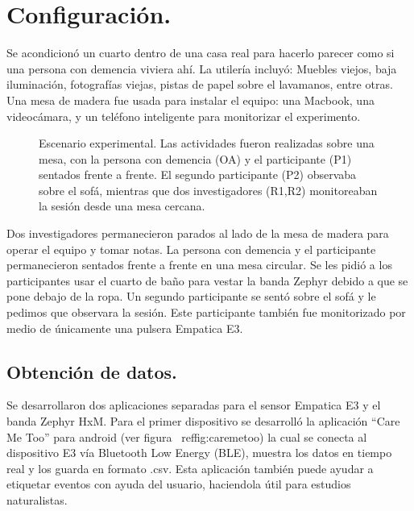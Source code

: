 \section{Configuraci\'on.}\label{secc:setup}
Se acondicion\'o un cuarto dentro de una casa real para hacerlo parecer como si una persona con demencia viviera ah\'i. La utiler\'ia incluy\'o: Muebles viejos, baja iluminaci\'on, fotograf\'ias viejas, pistas de papel sobre el lavamanos, entre otras. Una mesa de madera fue usada para instalar el equipo: una Macbook, una videoc\'amara, y un tel\'efono inteligente para monitorizar el experimento.
\begin{figure}[h]
        \centering
        \caption{Escenario experimental. Las actividades fueron realizadas sobre una mesa, con la persona con demencia (OA) y el participante (P1) sentados frente a frente. El segundo participante (P2) observaba sobre el sof\'a, mientras que dos investigadores (R1,R2) monitoreaban la sesi\'on desde una mesa cercana.} \label{fig:img_exp_setup}
\end{figure}

Dos investigadores permanecieron parados al lado de la mesa de madera para operar el equipo y tomar notas. La persona con demencia y el participante permanecieron sentados frente a frente en una mesa circular. Se les pidi\'o a los participantes usar el cuarto de ba\~no para vestar la banda Zephyr debido a que se pone debajo de la ropa. Un segundo participante se sent\'o sobre el sof\'a y le pedimos que observara la sesi\'on. Este participante tambi\'en fue monitorizado por medio de \'unicamente una pulsera Empatica E3.


\subsection{Obtenci\'on de datos.}\label{secc:datagathering}
Se desarrollaron dos aplicaciones separadas para el sensor Empatica E3 y el banda Zephyr HxM. Para el primer dispositivo se desarroll\'o la aplicaci\'on ``Care Me Too'' para android (ver figura ~ref{fig:caremetoo}) la cual se conecta al dispositivo E3 v\'ia Bluetooth Low Energy (BLE), muestra los datos en tiempo real y los guarda en formato .csv. Esta aplicaci\'on tambi\'en puede ayudar a etiquetar eventos con ayuda del usuario, haciendola \'util para estudios naturalistas.


